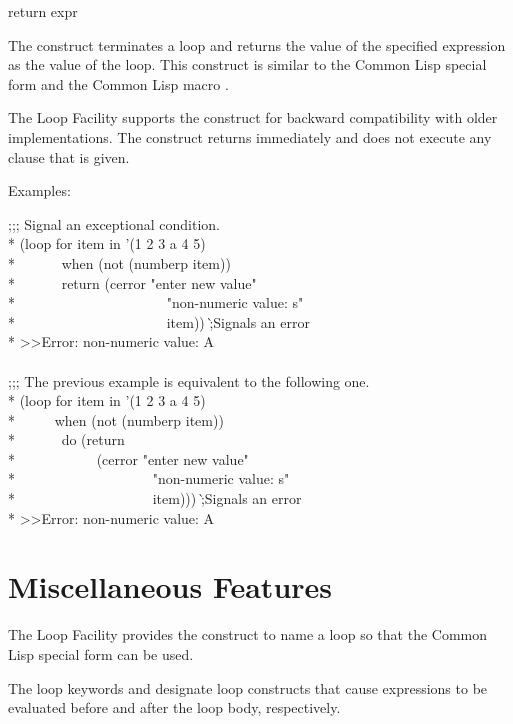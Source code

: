 \begin{new}
\begin{defloop}
return expr

The  construct terminates a 
loop and returns the value of 
the specified expression as the value of the loop.   This construct
is similar to the Common Lisp special form  and the
Common Lisp macro .

The Loop Facility supports the  construct for backward
compatibility with older  implementations.  
The  construct returns immediately and does not execute
any  clause that is given.

Examples:
\begin{lisp}
;;; Signal an exceptional condition. \\*
(loop for item in '(1 2 3 a 4 5) \\*
~~~~~~when (not (numberp item)) \\*
~~~~~~return (cerror "enter new value" \\*
~~~~~~~~~~~~~~~~~~~~~"non-numeric value: {\Xtilde}s" \\*
~~~~~~~~~~~~~~~~~~~~~item)) \`;{\rm Signals an error} \\*
>>Error: non-numeric value: A \\
 \\
;;; The previous example is equivalent to the following one. \\*
(loop for item in '(1 2 3 a 4 5) \\*
~~~~~when (not (numberp item)) \\*
~~~~~~do (return  \\*
~~~~~~~~~~~(cerror "enter new value" \\*
~~~~~~~~~~~~~~~~~~~"non-numeric value: {\Xtilde}s" \\*
~~~~~~~~~~~~~~~~~~~item)))  \`;{\rm Signals an error} \\*
>>Error: non-numeric value: A
\end{lisp}
\end{defloop}


\section{Miscellaneous Features}
\label{LOOP-MISC-SECTION}

The Loop Facility provides the  construct to name a loop so that
the Common Lisp special form  can be used.

The loop keywords  and  designate loop constructs that cause
expressions to be evaluated before and after the loop body, respectively.



\end{new}
